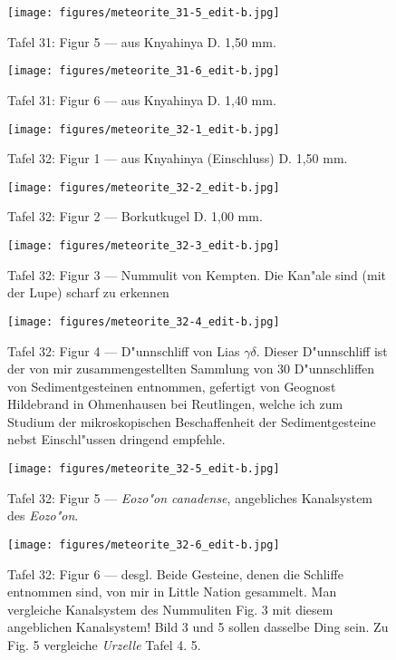 \documentclass[a4paper, 11pt, oneside]{article}
\begin{document}
\clearpage
\begin{figure}[t]
\texttt{[image: figures/meteorite\_31-5\_edit-b.jpg]}
\caption{Tafel 31: Figur 5 --- aus Knyahinya D. 1,50 mm.}
\centering
\end{figure}
\clearpage
\begin{figure}[t]
\texttt{[image: figures/meteorite\_31-6\_edit-b.jpg]}
\caption{Tafel 31: Figur 6 --- aus Knyahinya D. 1,40 mm.}
\centering
\end{figure}
\clearpage
{}
\begin{figure}[t]
\texttt{[image: figures/meteorite\_32-1\_edit-b.jpg]}
\caption{Tafel 32: Figur 1 --- aus Knyahinya (Einschluss) D. 1,50 mm.}
\centering
\end{figure}
\clearpage
\begin{figure}[t]
\texttt{[image: figures/meteorite\_32-2\_edit-b.jpg]}
\caption{Tafel 32: Figur 2 --- Borkutkugel D. 1,00 mm.}
\centering
\end{figure}
\clearpage
\begin{figure}[t]
\texttt{[image: figures/meteorite\_32-3\_edit-b.jpg]}
\caption{Tafel 32: Figur 3 --- Nummulit von Kempten. Die Kan"ale sind (mit der Lupe) scharf zu erkennen}
\centering
\end{figure}
\clearpage
\begin{figure}[t]
\texttt{[image: figures/meteorite\_32-4\_edit-b.jpg]}
\caption{Tafel 32: Figur 4 --- D"unnschliff von Lias $\gamma\delta$. Dieser D"unnschliff ist der von mir zusammengestellten Sammlung von 30 D"unnschliffen von Sedimentgesteinen entnommen, gefertigt von Geognost Hildebrand in Ohmenhausen bei Reutlingen, welche ich zum Studium der mikroskopischen Beschaffenheit der Sedimentgesteine nebst Einschl"ussen dringend empfehle.}
\centering
\end{figure}
\clearpage
\begin{figure}[t]
\texttt{[image: figures/meteorite\_32-5\_edit-b.jpg]}
\caption{Tafel 32: Figur 5 --- \emph{Eozo"on canadense}, angebliches Kanalsystem des \emph{Eozo"on}.}
\centering
\end{figure}
\clearpage
\begin{figure}[t]
\texttt{[image: figures/meteorite\_32-6\_edit-b.jpg]}
\caption{Tafel 32: Figur 6 --- desgl. Beide Gesteine, denen die Schliffe entnommen sind, von mir in Little Nation gesammelt. Man vergleiche Kanalsystem des Nummuliten Fig. 3 mit diesem angeblichen Kanalsystem! Bild 3 und 5 sollen dasselbe Ding sein. Zu Fig. 5 vergleiche \emph{Urzelle} Tafel 4. 5.}
\centering
\end{figure}
\clearpage
\pagestyle{plain}
\printindex
\clearpage
\end{document}
